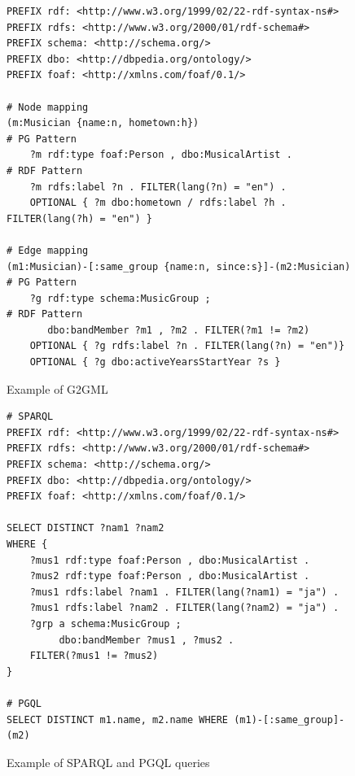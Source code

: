 \documentclass[runningheads]{llncs}
\begin{document}
\begin{figure}[!t]
\vspace{2mm}
\begin{scriptsize}
\begin{verbatim}
PREFIX rdf: <http://www.w3.org/1999/02/22-rdf-syntax-ns#>
PREFIX rdfs: <http://www.w3.org/2000/01/rdf-schema#>
PREFIX schema: <http://schema.org/>
PREFIX dbo: <http://dbpedia.org/ontology/>
PREFIX foaf: <http://xmlns.com/foaf/0.1/>

# Node mapping
(m:Musician {name:n, hometown:h})                            # PG Pattern
    ?m rdf:type foaf:Person , dbo:MusicalArtist .            # RDF Pattern
    ?m rdfs:label ?n . FILTER(lang(?n) = "en") .
    OPTIONAL { ?m dbo:hometown / rdfs:label ?h . FILTER(lang(?h) = "en") }

# Edge mapping
(m1:Musician)-[:same_group {name:n, since:s}]-(m2:Musician)  # PG Pattern
    ?g rdf:type schema:MusicGroup ;                          # RDF Pattern
       dbo:bandMember ?m1 , ?m2 . FILTER(?m1 != ?m2)
    OPTIONAL { ?g rdfs:label ?n . FILTER(lang(?n) = "en")}
    OPTIONAL { ?g dbo:activeYearsStartYear ?s }
\end{verbatim}
\end{scriptsize}
\caption{Example of G2GML}
\label{fig:g2gml}
\end{figure}

\begin{figure}[!t]
\vspace{2mm}
\begin{scriptsize}
\begin{verbatim}
# SPARQL
PREFIX rdf: <http://www.w3.org/1999/02/22-rdf-syntax-ns#>
PREFIX rdfs: <http://www.w3.org/2000/01/rdf-schema#>
PREFIX schema: <http://schema.org/>
PREFIX dbo: <http://dbpedia.org/ontology/>
PREFIX foaf: <http://xmlns.com/foaf/0.1/>

SELECT DISTINCT ?nam1 ?nam2
WHERE {
    ?mus1 rdf:type foaf:Person , dbo:MusicalArtist .
    ?mus2 rdf:type foaf:Person , dbo:MusicalArtist .
    ?mus1 rdfs:label ?nam1 . FILTER(lang(?nam1) = "ja") .
    ?mus1 rdfs:label ?nam2 . FILTER(lang(?nam2) = "ja") .
    ?grp a schema:MusicGroup ;
         dbo:bandMember ?mus1 , ?mus2 .
    FILTER(?mus1 != ?mus2)
}

# PGQL
SELECT DISTINCT m1.name, m2.name WHERE (m1)-[:same_group]-(m2)
\end{verbatim}
\end{scriptsize}
\caption{Example of SPARQL and PGQL queries}
\label{fig:sparql}
\end{figure}
\end{document}
